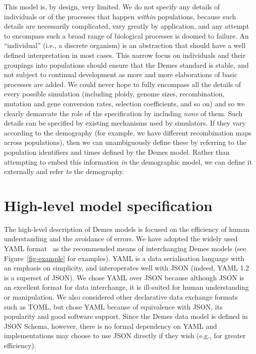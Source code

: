 \documentclass[11pt]{article}
\begin{document}
This model is, by design, very limited. We do not specify any details of
individuals or of the processes that happen \emph{within} populations,
because such details are necessarily complicated, vary greatly by
application, and any attempt to encompass such a broad range of biological
processes is doomed to failure. An ``individual'' (i.e., a discrete
organism) is an abstraction that should have a well defined interpretation
in most cases.
This narrow focus on individuals and their groupings into populations
should ensure that the Demes standard is stable, and not subject to
continual development as more and more elaborations of basic processes
are added. We could never hope to fully encompass all the details
of every possible simulation (including ploidy,
genome sizes, recombination, mutation and gene conversion rates,
selection coefficients, and so on) and so we clearly demarcate the
role of the specification by including \emph{none} of them.
Such details can be specified by existing mechanisms used by
simulators. If they vary according to the demography (for example,
we have different recombination maps across populations), then
we can unambiguously define these by referring to the population
identifiers and times defined by the Demes model. Rather than attempting
to embed this information \emph{in} the demographic model, we
can define it externally and refer \emph{to} the demography.

\section{High-level model specification}\label{sec:appendix-spec}

The high-level description of Demes models is focused on the efficiency of
human understanding and the avoidance of errors. We have adopted the widely
used YAML format~\citep{ben2009yaml} as the recommended means of interchanging
Demes models (see Figure~\ref{fig-example} for examples). YAML is a data
serialisation language with an emphasis on simplicity, and interoperates well
with JSON (indeed, YAML 1.2 is a superset of JSON). We chose YAML over JSON
because although JSON is an excellent format for data interchange, it is
ill-suited for human understanding or manipulation. We also considered other
declarative data exchange formats such as TOML,
but chose YAML because of equivalence with JSON,
its popularity and good software support.
Since the Demes data model is defined in JSON Schema,
however, there is no formal dependency on YAML and implementations may choose
to use JSON directly if they wish (e.g., for greater efficiency).
\end{document}
